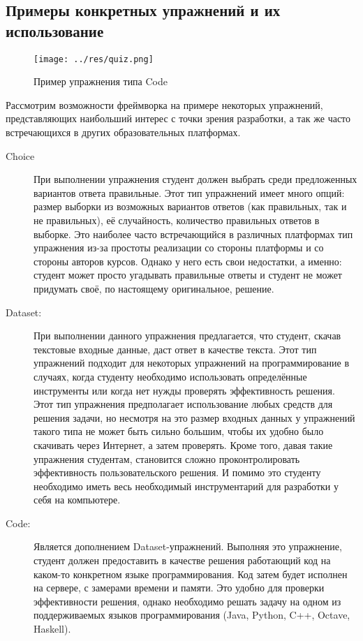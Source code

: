 \documentclass{matmex-diploma-custom}
\begin{document}
\subsection{Примеры конкретных упражнений и их использование}
\begin{figure}
  \texttt{[image: ../res/quiz.png]}
  \caption{Пример упражнения типа Code}
\end{figure}

Рассмотрим возможности фреймворка на примере некоторых упражнений,
представляющих наибольший интерес с точки зрения разработки, а так же
часто встречающихся в других образовательных платформах.

\begin{description}
\item[Choice] При выполнении упражнения студент должен выбрать среди
  предложенных вариантов ответа правильные. Этот тип упражнений имеет
  много опций: размер выборки из возможных вариантов ответов (как
  правильных, так и не правильных), её случайность, количество
  правильных ответов в выборке. Это наиболее часто встречающийся в
  различных платформах тип упражнения из-за простоты реализации со
  стороны платформы и со стороны авторов курсов. Однако у него есть
  свои недостатки, а именно: студент может просто угадывать правильные
  ответы и студент не может придумать своё, по настоящему
  оригинальное, решение.

\item[Dataset:] При выполнении данного упражнения предлагается, что
  студент, скачав текстовые входные данные, даст ответ в качестве
  текста. Этот тип упражнений подходит для некоторых упражнений на
  программирование в случаях, когда студенту необходимо использовать
  определённые инструменты или когда нет нужды проверять эффективность
  решения. Этот тип упражнения предполагает использование любых
  средств для решения задачи, но несмотря на это размер входных данных
  у упражнений такого типа не может быть сильно большим, чтобы их
  удобно было скачивать через Интернет, а затем проверять. Кроме того,
  давая такие упражнения студентам, становится сложно
  проконтролировать эффективность пользовательского решения. И помимо
  это студенту необходимо иметь весь необходимый инструментарий для
  разработки у себя на компьютере.

\item[Code:] Является дополнением Dataset-упражнений. Выполняя это
  упражнение, студент должен предоставить в качестве решения
  работающий код на каком-то конкретном языке программирования. Код
  затем будет исполнен на сервере, с замерами времени и памяти. Это
  удобно для проверки эффективности решения, однако необходимо решать
  задачу на одном из поддерживаемых языков программирования (Java,
  Python, C++, Octave, Haskell).

\end{description}
\end{document}
